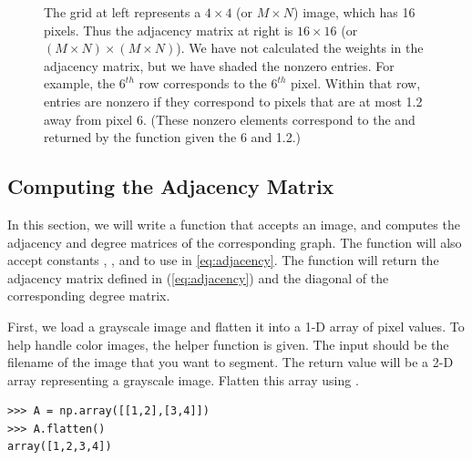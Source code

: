 \begin{figure}

\caption{The grid at left represents a $4\times4$ (or $M \times N$) image, which has 16 pixels. Thus the adjacency matrix at right is $16 \times 16$ (or $(M \times N) \times (M \times N)$). We have not calculated the weights in the adjacency matrix, but we have shaded the nonzero entries. For example, the $6^{th}$ row corresponds to the $6^{th}$ pixel. Within that row, entries are nonzero if they correspond to pixels that are at most 1.2 away from pixel 6. (These nonzero elements correspond to the  and  returned by the  function given the  6 and  1.2.)}
\label{fig:adjacency}
\end{figure}


\subsection*{Computing the Adjacency Matrix}
In this section, we will write a function that accepts an image, and computes the adjacency and degree matrices of the corresponding graph.
The function will also accept constants , , and  to use in \ref{eq:adjacency}. 
The function will return the adjacency matrix defined in (\ref{eq:adjacency}) and the diagonal of the corresponding degree matrix. 

First, we load a grayscale image and flatten it into a 1-D array of pixel values. To help handle color images, the helper function  is given. The input  should be the filename of the image that you want to segment. The return value will be a 2-D array representing a grayscale image. Flatten this array using .
\begin{lstlisting}
>>> A = np.array([[1,2],[3,4]])
>>> A.flatten()                
array([1,2,3,4])
\end{lstlisting}

